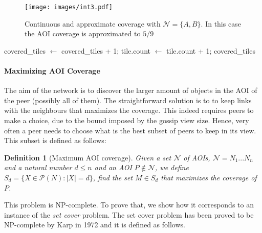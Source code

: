 \documentclass[final,10pt,a5paper]{phdimt}
\theoremstyle{definition}
\newtheorem{mydef}{Definition}
\begin{document}
\begin{figure}[tb]
\centering
\texttt{[image: images/int3.pdf]}
\caption{Continuous and approximate coverage with $\mathscr{N} = \{A,B\}$. In this case the AOI coverage is approximated to $5/9$}\label{fig:app-cont}
\end{figure}

\begin{algorithm}[h]


\BlankLine

{
  {
    {
      {
      covered\_tiles $\leftarrow$ covered\_tiles + 1;
      }
      tile.count $\leftarrow$ tile.count + 1;
    }
  }
}
\Return covered\_tiles\;

\caption{Coverage(P, $\mathscr{N}$)}\label{alg:approximate-coverage}
\end{algorithm}


\paragraph{Maximizing AOI Coverage}

The aim of the network is to discover the larger amount of objects in the AOI of the peer (possibly all of them). The straightforward solution is to to keep links with the neighbours that maximizes the coverage. This indeed requires peers to make a choice, due to the bound imposed by the gossip view size. Hence, very often a peer needs to choose what is the best subset of peers to keep in its view. This subset is defined as follows:

\begin{mydef}[Maximum AOI coverage]
\emph{
Given a set $\mathscr{N}$ of AOIs, $\mathscr{N} = {N_1...N_n}$ and a natural number $d \leq n$ and an AOI $P \notin \mathscr{\mathscr{N}}$, we define $S_d = \{ X \in \mathscr{P}(N): |X| = d \}$, find the set $M \in S_d$ that maximizes the coverage of $P$.}
\end{mydef}


This problem is NP-complete. To prove that, we show how it corresponds to an instance of the \textit{set cover} problem. 
The set cover problem has been proved to be NP-complete by Karp in 1972 \cite{karp1972reducibility} and it is defined as follows.
\end{document}
